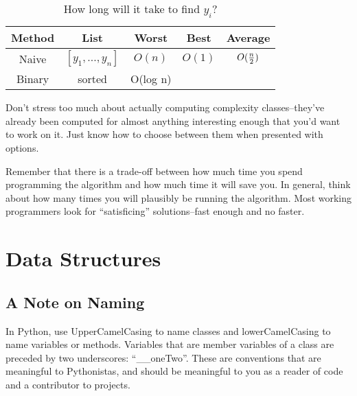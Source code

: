 \documentclass[12pt,letter]{article}
\begin{document}

\begin{table}
\begin{center}
\caption{How long will it take to find $y_i$?}
\begin{tabular}{ccccc}
Method & List & Worst & Best & Average \\
\hline
Naive & $[y_1, ..., y_n]$ & $O(n) $ & $O(1)$ & $O({n\over2})$ \\
Binary & sorted & O(log n) & \\
\end{tabular}
\end{center}
\end{table}

Don't stress too much about actually computing complexity
classes--they've already been computed for almost anything interesting
enough that you'd want to work on it. Just know how to choose between
them when presented with options. 

Remember that there is a trade-off between how much time you spend
programming the algorithm and how much time it will save you. In
general, think about how many times you will plausibly be running the
algorithm. Most working programmers look for ``satisficing''
solutions--fast enough and no faster. 
 



\section{Data Structures}
\subsection{A Note on Naming}
In Python, use UpperCamelCasing to name classes and lowerCamelCasing
to name variables or methods. Variables that are member variables of a
class are preceded by two underscores: ``\_\_oneTwo''. These are
conventions that are meaningful to Pythonistas, and should be
meaningful to you as a reader of code and a contributor to projects.
\end{document}

